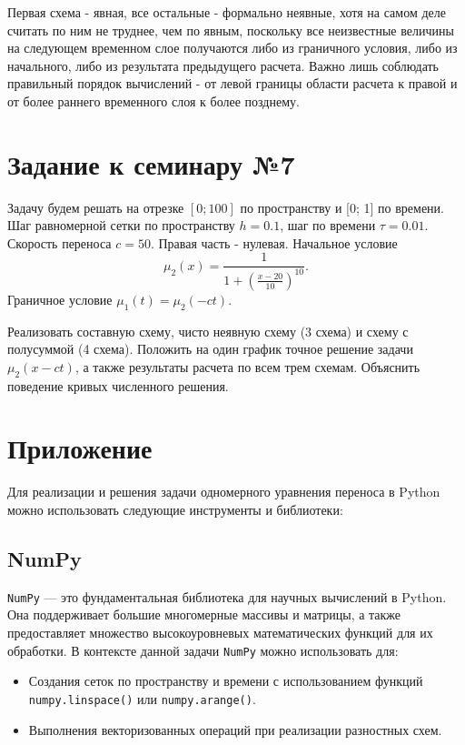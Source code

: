 \documentclass{report}
\begin{document}
Первая схема - явная, все остальные - формально неявные, хотя на самом деле считать по ним не труднее, чем по явным, поскольку все неизвестные величины на следующем временном слое получаются либо из граничного условия, либо из начального, либо из результата предыдущего расчета. Важно лишь соблюдать правильный порядок вычислений - от левой границы области расчета к правой и от более раннего временного слоя к более позднему.


\section*{Задание к семинару №7}
Задачу будем решать на отрезке  $[0; 100]$ по пространству и   [0; 1] по времени. Шаг равномерной сетки по пространству $h = 0.1$, шаг по времени $\tau = 0.01$. Скорость переноса $c = 50$. Правая часть - нулевая. Начальное условие
\begin{equation} 
    \mu_2(x) = \frac{1}{1 + \left( \displaystyle \frac{x-20}{10} \right)^{10}}. \label{c7eq6}
\end{equation}
Граничное условие $\mu_1(t) = \mu_2(-ct)$.

Реализовать составную схему, чисто неявную схему (3 схема) и схему с полусуммой (4 схема). Положить на один график точное решение задачи $\mu_2(x-ct)$, а также результаты расчета по всем трем схемам. Объяснить поведение кривых численного решения.


\section*{Приложение}
Для реализации и решения задачи одномерного уравнения переноса в Python можно использовать следующие инструменты и библиотеки:

\subsection*{NumPy}
\texttt{NumPy} — это фундаментальная библиотека для научных вычислений в Python. Она поддерживает большие многомерные массивы и матрицы, а также предоставляет множество высокоуровневых математических функций для их обработки. В контексте данной задачи \texttt{NumPy} можно использовать для:
\begin{itemize}
    \item Создания сеток по пространству и времени с использованием функций \texttt{numpy.linspace()} или \texttt{numpy.arange()}.
    \item Выполнения векторизованных операций при реализации разностных схем.
\end{itemize}
\end{document}
